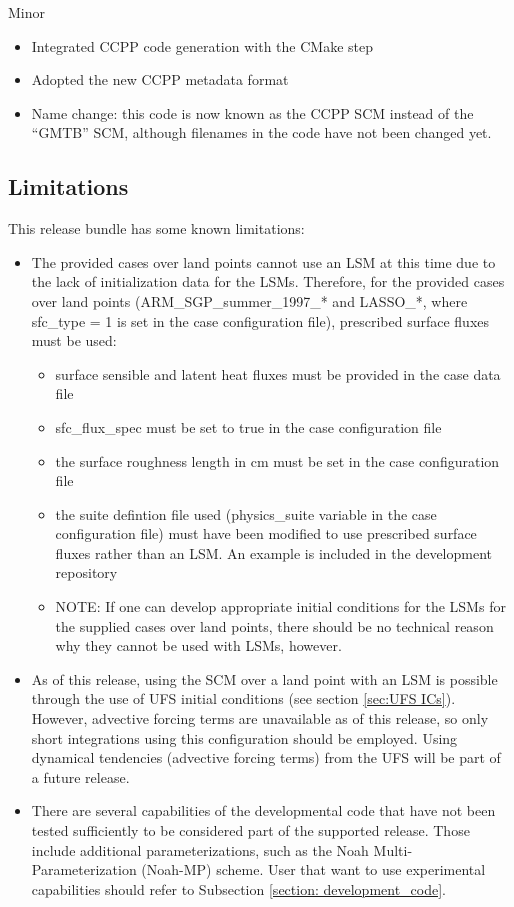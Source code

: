 Minor
\begin{itemize}
\item Integrated CCPP code generation with the CMake step
\item Adopted the new CCPP metadata format
\item Name change: this code is now known as the CCPP SCM instead of the ``GMTB'' SCM, although filenames in the code have not been changed yet.
\end{itemize}

\subsection{Limitations}

This release bundle has some known limitations:

\begin{itemize}
\item The provided cases over land points cannot use an LSM at this time due to the lack of initialization data for the LSMs. Therefore, for the provided cases over land points (ARM\_SGP\_summer\_1997\_* and LASSO\_*, where sfc\_type = 1 is set in the case configuration file), prescribed surface fluxes must be used:
\begin{itemize}
\item surface sensible and latent heat fluxes must be provided in the case data file
\item sfc\_flux\_spec must be set to true in the case configuration file
\item the surface roughness length in cm must be set in the case configuration file
\item the suite defintion file used (physics\_suite variable in the case configuration file) must have been modified to use prescribed surface fluxes rather than an LSM. An example is included in the development repository
\item NOTE: If one can develop appropriate initial conditions for the LSMs for the supplied cases over land points, there should be no technical reason why they cannot be used with LSMs, however.
\end{itemize}
\item As of this release, using the SCM over a land point with an LSM is possible through the use of UFS initial conditions (see section \ref{sec:UFS ICs}). However, advective forcing terms are unavailable as of this release, so only short integrations using this configuration should be employed. Using dynamical tendencies (advective forcing terms) from the UFS will be part of a future release.
\item There are several capabilities of the developmental code that have not been tested sufficiently to be considered part of the supported release. Those include additional parameterizations, such as the Noah Multi-Parameterization (Noah-MP) scheme. User that want to use experimental capabilities should refer to Subsection \ref{section: development_code}.
\end{itemize}
